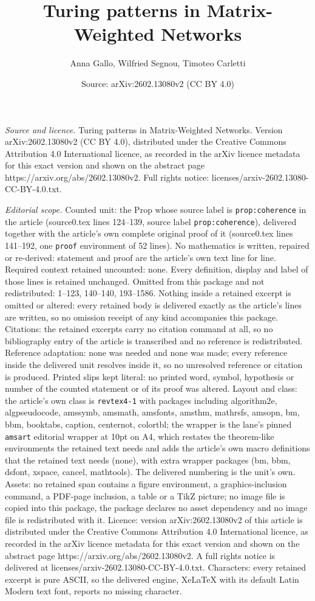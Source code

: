 \documentclass[10pt,a4paper]{amsart}
\title[Turing patterns in Matrix-Weighted Networks]{Turing patterns in Matrix-Weighted Networks}
\author{Anna Gallo, Wilfried Segnou, Timoteo Carletti}
\date{Source: arXiv:2602.13080v2 (CC BY 4.0)}
\begin{document}
\maketitle

\noindent\emph{Source and licence.} Turing patterns in Matrix-Weighted Networks. Version arXiv:2602.13080v2 (CC BY 4.0), distributed under the Creative Commons Attribution 4.0 International licence, as recorded in the arXiv licence metadata for this exact version and shown on the abstract page https://arxiv.org/abs/2602.13080v2. Full rights notice: licenses/arxiv-2602.13080-CC-BY-4.0.txt.\par\smallskip

\noindent\textit{Editorial scope.} Counted unit: the Prop whose source label is \texttt{prop:coherence} in the article (source0.tex lines 124--139, source label \texttt{prop:coherence}), delivered together with the article's own complete original proof of it (source0.tex lines 141--192, one \texttt{proof} environment of 52 lines). No mathematics is written, repaired or re-derived: statement and proof are the article's own text line for line. Required context retained uncounted: none. Every definition, display and label of those lines is retained unchanged. Omitted from this package and not redistributed: 1--123, 140--140, 193--1586. Nothing inside a retained excerpt is omitted or altered: every retained body is delivered exactly as the article's lines are written, so no omission receipt of any kind accompanies this package. Citations: the retained excerpts carry no citation command at all, so no bibliography entry of the article is transcribed and no reference is redistributed. Reference adaptation: none was needed and none was made; every reference inside the delivered unit resolves inside it, so no unresolved reference or citation is produced. Printed slips kept literal: no printed word, symbol, hypothesis or number of the counted statement or of its proof was altered. Layout and class: the article's own class is \texttt{revtex4-1} with packages including algorithm2e, algpseudocode, amssymb, amsmath, amsfonts, amsthm, mathrsfs, amsopn, bm, bbm, booktabs, caption, centernot, colortbl; the wrapper is the lane's pinned \texttt{amsart} editorial wrapper at 10pt on A4, which restates the theorem-like environments the retained text needs and adds the article's own macro definitions that the retained text needs (none), with extra wrapper packages (bm, bbm, dsfont, xspace, cancel, mathtools). The delivered numbering is the unit's own. Assets: no retained span contains a figure environment, a graphics-inclusion command, a PDF-page inclusion, a table or a TikZ picture; no image file is copied into this package, the package declares no asset dependency and no image file is redistributed with it. Licence: version arXiv:2602.13080v2 of this article is distributed under the Creative Commons Attribution 4.0 International licence, as recorded in the arXiv licence metadata for this exact version and shown on the abstract page https://arxiv.org/abs/2602.13080v2. A full rights notice is delivered at licenses/arxiv-2602.13080-CC-BY-4.0.txt. Characters: every retained excerpt is pure ASCII, so the delivered engine, XeLaTeX with its default Latin Modern text font, reports no missing character.
\end{document}
